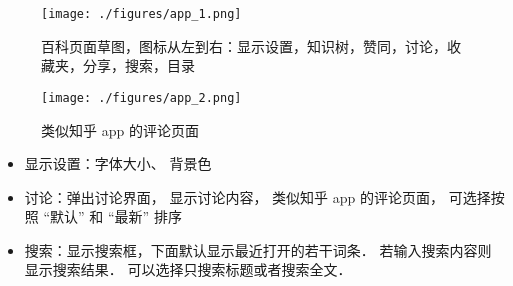 
\begin{figure}[ht]
\centering
\texttt{[image: ./figures/app\_1.png]}
\caption{百科页面草图，图标从左到右：显示设置，知识树，赞同，讨论，收藏夹，分享，搜索，目录} \label{app_fig1}
\end{figure}

\begin{figure}[ht]
\centering
\texttt{[image: ./figures/app\_2.png]}
\caption{类似知乎 app 的评论页面} \label{app_fig2}
\end{figure}

\begin{itemize}
\item 显示设置：字体大小、 背景色
\item 讨论：弹出讨论界面， 显示讨论内容， 类似知乎 app 的评论页面， 可选择按照 “默认” 和 “最新” 排序
\item 搜索：显示搜索框，下面默认显示最近打开的若干词条． 若输入搜索内容则显示搜索结果． 可以选择只搜索标题或者搜索全文．
\end{itemize}
